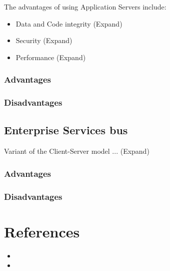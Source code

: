 \documentclass[12pt, letterpaper, twoside]{article}
\begin{document}
The advantages of using Application Servers include:
\begin{itemize}
\item Data and Code integrity (Expand)
\item Security (Expand)
\item Performance (Expand)
\end{itemize}

\subsubsection{Advantages}

\subsubsection{Disadvantages}
%

\subsection{Enterprise Services bus}
Variant of the Client-Server model ... (Expand)


\subsubsection{Advantages}

\subsubsection{Disadvantages}

\section{References}

\begin{itemize}

\item

\item

\end{itemize}
\end{document}
